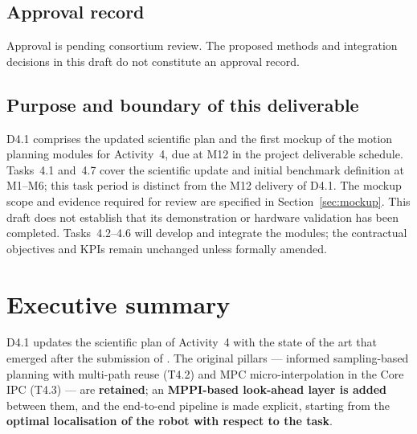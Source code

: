 \documentclass{plan4ari_report}
\begin{document}
\makecover%

\begin{documentcontrol}
\end{documentcontrol}

\subsection*{Approval record}
Approval is pending consortium review. The proposed methods and integration decisions in this draft do not constitute an approval record.

\subsection*{Purpose and boundary of this deliverable}
D4.1 comprises the updated scientific plan and the first mockup of the motion planning modules for Activity~4, due at M12 in the project deliverable schedule. Tasks~4.1 and~4.7 cover the scientific update and initial benchmark definition at M1--M6; this task period is distinct from the M12 delivery of D4.1. The mockup scope and evidence required for review are specified in Section~\ref{sec:mockup}. This draft does not establish that its demonstration or hardware validation has been completed. Tasks~4.2--4.6 will develop and integrate the modules; the contractual objectives and KPIs remain unchanged unless formally amended.

\sectionsonsamepage%
\tableofcontents%
\sectionsonnewpage%

\section{Executive summary}\label{sec:exec}

\begin{planbox}
D4.1 updates the scientific plan of Activity~4 with the state of the art that emerged after the submission of \PlanARI. The original pillars --- informed sampling-based planning with multi-path reuse (T4.2) and MPC micro-interpolation in the Core IPC (T4.3) --- are \textbf{retained}; an \textbf{MPPI-based look-ahead layer is added} between them, and the end-to-end pipeline is made explicit, starting from the \textbf{optimal localisation of the robot with respect to the task}.
\end{planbox}
\end{document}
